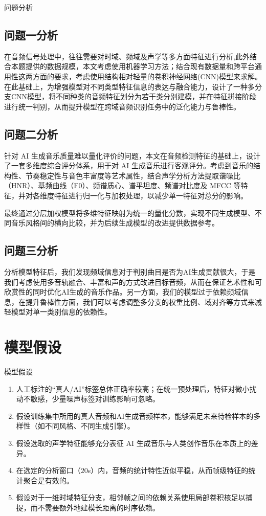 \documentclass[aspectratio=169]{beamer}
\begin{document}
\begin{frame}{问题分析}
\small
\subsection{问题一分析}
在音频信号处理中，往往需要对时域、频域及声学等多方面特征进行分析,此外结合本题提供的数据规模，本文考虑使用机器学习方法；结合现有数据量和跨平台通用性这两方面的要求，考虑使用结构相对轻量的卷积神经网络(CNN)模型来求解。在此基础上，为增强模型对不同类型特征信息的表达与融合能力，设计了一种多分支CNN模型，将不同种类的音频特征划分为若干类分别建模，并在特征拼接阶段进行统一判别，从而提升模型在跨域音频识别任务中的泛化能力与鲁棒性。

\subsection{问题二分析}

针对 AI 生成音乐质量难以量化评价的问题，本文在音频检测特征的基础上，设计了一套多维度综合评分体系，用于对 AI 生成音乐进行客观评分。考虑到音乐的结构性、节奏稳定性与音色丰富度等艺术属性，结合声学分析方法提取谐噪比（HNR）、基频曲线（F0）、频谱质心、谱平坦度、频谱对比度及 MFCC 等特征，并对各维度特征进行归一化与加权处理，以减少单一特征对总分的影响。

最终通过分层加权模型将多维特征映射为统一的量化分数，实现不同生成模型、不同音乐风格间的横向比较，并为后续生成模型的改进提供数据参考。
\subsection{问题三分析}
分析模型特征后，我们发现频域信息对于判别曲目是否为AI生成贡献很大，于是我们考虑使用多音轨融合、丰富和声的方式改进目标音频，从而在保证艺术性和可欣赏性的同时优化AI生成的音乐作品。另一方面，我们的模型过于依赖频域信息，在提升鲁棒性方面，我们可以考虑调整多分支的权重比例、域对齐等方式来减轻模型对单一类别信息的依赖性。
\end{frame}

\section{模型假设}

\begin{frame}{模型假设}
\small
\begin{enumerate}
    \item 人工标注的“真人/AI”标签总体正确率较高；在统一预处理后，特征对微小扰动不敏感，少量噪声标签对训练影响可忽略。
    \item 假设训练集中所用的真人音频和AI生成音频样本，能够满足未来待检样本的多样性（如不同风格、不同生成引擎）。
    \item 假设选取的声学特征能够充分表征 AI 生成音乐与人类创作音乐在本质上的差异。
    \item 在选定的分析窗口（$20$s）内，音频的统计特性近似平稳，从而帧级特征的统计聚合是有效的。
    \item 假设对于一维时域特征分支，相邻帧之间的依赖关系使用局部卷积核足以捕捉，而不需要额外地建模长距离的时序依赖。
    
\end{enumerate}
\end{frame}
\end{document}
